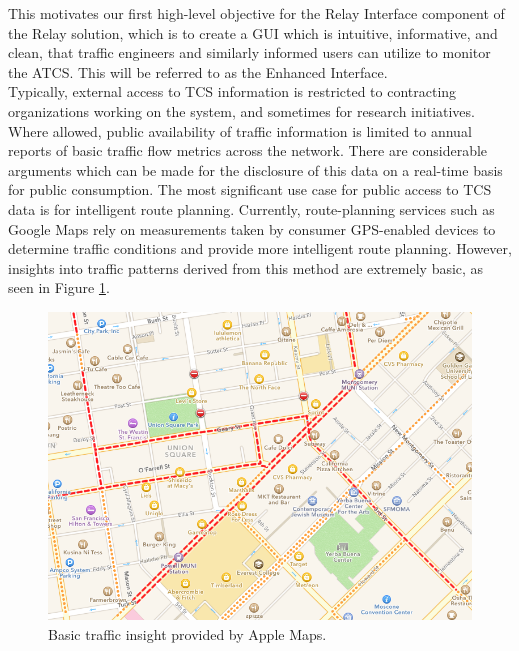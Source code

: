 \documentclass{article}
\begin{document}
This motivates our first high-level objective for the Relay Interface component of the Relay solution, which is to create a GUI which is intuitive, informative, and clean, that traffic engineers and similarly informed users can utilize to monitor the ATCS.
This will be referred to as the Enhanced Interface.\\

Typically, external access to TCS information is restricted to contracting organizations working on the system, and sometimes for research initiatives.
Where allowed, public availability of traffic information is limited to annual reports of basic traffic flow metrics across the network.
There are considerable arguments which can be made for the disclosure of this data on a real-time basis for public consumption.
The most significant use case for public access to TCS data is for intelligent route planning.
Currently, route-planning services such as Google Maps rely on measurements taken by consumer GPS-enabled devices to determine traffic conditions and provide more intelligent route planning.
However, insights into traffic patterns derived from this method are extremely basic, as seen in Figure \ref{fig:apple-maps}.\\

\begin{figure}[htbp!]
  \begin{centering}
    \includegraphics[scale=0.46]{figures/apple-maps.png}
    \caption{Basic traffic insight provided by Apple Maps.}
    \label{fig:apple-maps}
  \end{centering}
\end{figure}
\end{document}
